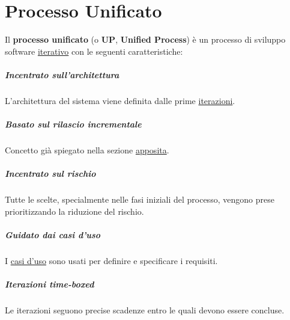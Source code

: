 \chapter{Processo Unificato}
\label{chap:processo-unificato}
Il \textbf{processo unificato} (o \textbf{UP}, \textbf{Unified Process}) è un processo di sviluppo software \hyperref[process-model:iterativi]{iterativo} con le seguenti caratteristiche:
\paragraph{Incentrato sull'architettura} L'{architettura} del sistema viene definita dalle prime \hyperref[process-model:iterativi]{iterazioni}.
\paragraph{Basato sul rilascio incrementale} Concetto già spiegato nella sezione \hyperref[concept:rilascio-incrementale]{apposita}.
\paragraph{Incentrato sul rischio} Tutte le scelte, specialmente nelle fasi iniziali del processo, vengono prese prioritizzando la riduzione del {rischio}.
\paragraph{Guidato dai casi d'uso} I \hyperref[concept:casi-duso]{casi d'uso} sono usati per definire e specificare i requisiti.
\paragraph{Iterazioni time-boxed} Le iterazioni seguono precise scadenze entro le quali devono essere concluse. 


